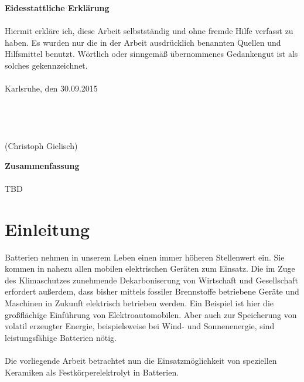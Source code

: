 \documentclass[a4paper, 11pt, headsepline,footsepline,twoside,abstract]{scrbook}
\begin{document}
\cleardoubleemptypage
\setcounter{page}{1}
\textbf{\Large{Eidesstattliche Erklärung}}
\\\\
Hiermit erkläre ich, diese Arbeit selbstständig und ohne fremde Hilfe verfasst zu haben. Es wurden nur die in der Arbeit ausdrücklich benannten Quellen und Hilfsmittel benutzt. Wörtlich oder sinngemäß übernommenes Gedankengut ist als solches gekennzeichnet.
\\\\
Karlsruhe, den 30.09.2015
\\\\
\\\\
\\
(Christoph Gielisch) 
 
\newpage

\setcounter{page}{1}
\textbf{\Large{Zusammenfassung}}
\\\\
TBD
\pagestyle{toc}
\renewcommand*{\chapterpagestyle}{toc} %
\tableofcontents
{} 
\newpage
\cleardoubleemptypage
\pagestyle{normal}
\renewcommand*{\chapterpagestyle}{plain}
\setcounter{page}{1}
\chapter{Einleitung}
Batterien nehmen in unserem Leben einen immer höheren Stellenwert ein. Sie kommen in nahezu allen mobilen elektrischen Geräten zum Einsatz. Die im Zuge des Klimaschutzes zunehmende Dekarboniserung von Wirtschaft und Gesellschaft erfordert außerdem, dass bisher mittels fossiler Brennstoffe betriebene Geräte und Maschinen in Zukunft elektrisch betrieben werden. Ein Beispiel ist hier die großflächige Einführung von Elektroautomobilen. Aber auch zur Speicherung von volatil erzeugter Energie, beispielsweise bei Wind- und Sonnenenergie, sind leistungsfähige Batterien nötig.
\\\\
Die vorliegende Arbeit betrachtet nun die Einsatzmöglichkeit von speziellen Keramiken als Festkörperelektrolyt in Batterien.
\end{document}
